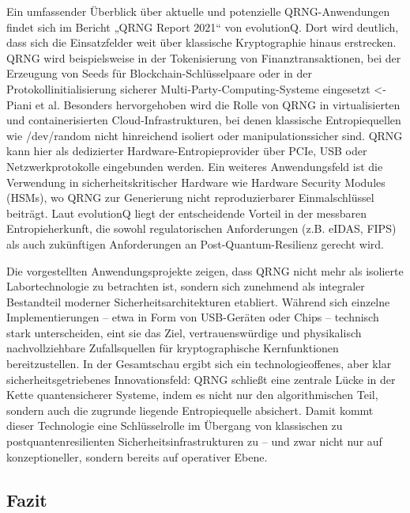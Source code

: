 Ein umfassender Überblick über aktuelle und potenzielle QRNG-Anwendungen findet sich im Bericht „QRNG Report 2021“ von evolutionQ. Dort wird deutlich, dass sich die Einsatzfelder weit über klassische Kryptographie hinaus erstrecken. QRNG wird beispielsweise in der Tokenisierung von Finanztransaktionen, bei der Erzeugung von Seeds für Blockchain-Schlüsselpaare oder in der Protokollinitialisierung sicherer Multi-Party-Computing-Systeme eingesetzt \cite{??????} <- Piani et al. Besonders hervorgehoben wird die Rolle von QRNG in virtualisierten und containerisierten Cloud-Infrastrukturen, bei denen klassische Entropiequellen wie /dev/random nicht hinreichend isoliert oder manipulationssicher sind. QRNG kann hier als dedizierter Hardware-Entropieprovider über PCIe, USB oder Netzwerkprotokolle eingebunden werden. Ein weiteres Anwendungsfeld ist die Verwendung in sicherheitskritischer Hardware wie Hardware Security Modules (HSMs), wo QRNG zur Generierung nicht reproduzierbarer Einmalschlüssel beiträgt. Laut evolutionQ liegt der entscheidende Vorteil in der messbaren Entropieherkunft, die sowohl regulatorischen Anforderungen (z.B. eIDAS, FIPS) als auch zukünftigen Anforderungen an Post-Quantum-Resilienz gerecht wird.

Die vorgestellten Anwendungsprojekte zeigen, dass QRNG nicht mehr als isolierte Labortechnologie zu betrachten ist, sondern sich zunehmend als integraler Bestandteil moderner Sicherheitsarchitekturen etabliert. Während sich einzelne Implementierungen – etwa in Form von USB-Geräten oder Chips – technisch stark unterscheiden, eint sie das Ziel, vertrauenswürdige und physikalisch nachvollziehbare Zufallsquellen für kryptographische Kernfunktionen bereitzustellen. In der Gesamtschau ergibt sich ein technologieoffenes, aber klar sicherheitsgetriebenes Innovationsfeld: QRNG schließt eine zentrale Lücke in der Kette quantensicherer Systeme, indem es nicht nur den algorithmischen Teil, sondern auch die zugrunde liegende Entropiequelle absichert. Damit kommt dieser Technologie eine Schlüsselrolle im Übergang von klassischen zu postquantenresilienten Sicherheitsinfrastrukturen zu – und zwar nicht nur auf konzeptioneller, sondern bereits auf operativer Ebene.

\subsection{Fazit}




\printbibliography
